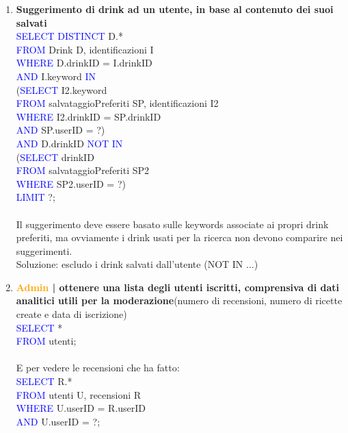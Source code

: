 \documentclass[a4paper,12pt]{report}
\begin{document}
\begin{enumerate}
    \item \textbf{Suggerimento di drink ad un utente, in base al contenuto dei suoi salvati}\\
        \textcolor{blue}{SELECT DISTINCT} D.*\\
        \textcolor{blue}{FROM} Drink D, identificazioni I\\
        \textcolor{blue}{WHERE} D.drinkID = I.drinkID\\
        \textcolor{blue}{AND} I.keyword \textcolor{blue}{IN}\\
        (\textcolor{blue}{SELECT} I2.keyword\\
        \textcolor{blue}{ FROM} salvataggioPreferiti SP, identificazioni I2\\
        \textcolor{blue}{WHERE} I2.drinkID = SP.drinkID\\
        \textcolor{blue}{AND} SP.userID = ?)\\
        \textcolor{blue}{AND} D.drinkID \textcolor{blue}{NOT IN}\\
        (\textcolor{blue}{SELECT} drinkID \\
        \textcolor{blue}{FROM} salvataggioPreferiti SP2\\
        \textcolor{blue}{WHERE} SP2.userID = ?)\\
        \textcolor{blue}{LIMIT} ?;
        \\\\
        Il suggerimento deve essere basato sulle keywords associate ai propri drink preferiti, ma ovviamente i drink usati per la ricerca non devono comparire nei suggerimenti.\\
        Soluzione: escludo i drink salvati dall'utente (NOT IN ...)
        
    \item \textbf{\textcolor{orange}{Admin} | ottenere una lista degli utenti iscritti, comprensiva di dati analitici utili per la moderazione}\footnotesize (numero di recensioni, numero di ricette create e data di iscrizione)\normalsize\\
    \textcolor{blue}{SELECT} *\\
    \textcolor{blue}{FROM} utenti;\\
    \\
    E per vedere le recensioni che ha fatto:\\
    \textcolor{blue}{SELECT} R.*\\
    \textcolor{blue}{FROM} utenti U, recensioni R\\
    \textcolor{blue}{WHERE} U.userID = R.userID\\
    \textcolor{blue}{AND} U.userID = ?;
    

\end{enumerate}
\end{document}
